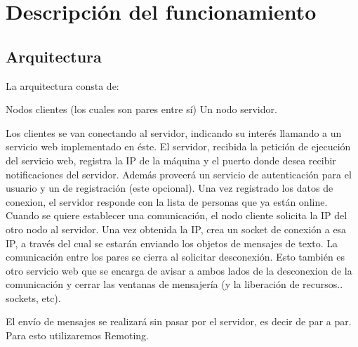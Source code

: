 \section{Descripción del funcionamiento}
\subsection{Arquitectura}
La arquitectura consta de:

Nodos clientes (los cuales son pares entre sí)
Un nodo servidor.

Los clientes se van conectando al servidor, indicando su interés llamando a un servicio web implementado en éste. El servidor, recibida la petición de ejecución del servicio web, registra la IP de la máquina y el puerto donde desea recibir notificaciones del servidor. Además proveerá un servicio de autenticación para el usuario y un de registración (este opcional). Una vez registrado los datos de conexion, el servidor responde con la lista de personas que ya están online.
Cuando se quiere establecer una comunicación, el nodo cliente solicita la IP del otro nodo al servidor. Una vez obtenida la IP, crea un socket de conexión a esa IP, a través del cual se estarán enviando los objetos de mensajes de texto.
La comunicación entre los pares se cierra al solicitar desconexión. Esto también es otro servicio web que se encarga de avisar a ambos lados de la desconexion de la comunicación y cerrar las ventanas de mensajería (y la liberación de recursos.. sockets, etc).

El envío de mensajes se realizará sin pasar por el servidor, es decir de par a par. Para esto utilizaremos Remoting.
